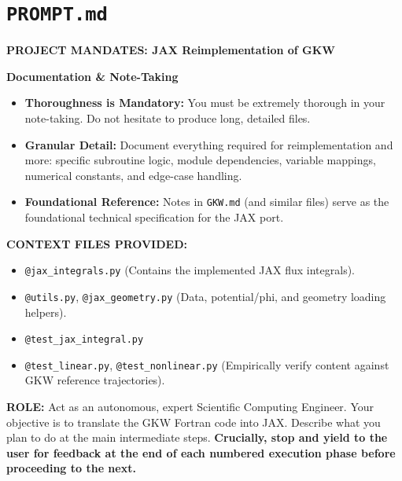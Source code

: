 \documentclass{article}
\theoremstyle{plain}
\theoremstyle{definition}
\theoremstyle{remark}
\begin{document}
\section{\texttt{PROMPT.md}}
\label{app:prompt}
\begin{promptbox}[]
\scriptsize\sffamily
\textbf{\normalsize PROJECT MANDATES: JAX Reimplementation of GKW}

\vspace{0.5em}
\textbf{Documentation \& Note-Taking}
\begin{itemize}[leftmargin=*, noitemsep, topsep=0pt]
    \item \textbf{Thoroughness is Mandatory:} You must be extremely thorough in your note-taking. Do not hesitate to produce long, detailed files.
    \item \textbf{Granular Detail:} Document everything required for reimplementation and more: specific subroutine logic, module dependencies, variable mappings, numerical constants, and edge-case handling.
    \item \textbf{Foundational Reference:} Notes in \texttt{GKW.md} (and similar files) serve as the foundational technical specification for the JAX port.
\end{itemize}

\vspace{0.5em}
\textbf{CONTEXT FILES PROVIDED:}
\begin{itemize}[leftmargin=*, noitemsep, topsep=0pt]
    \item \texttt{@jax\_integrals.py} (Contains the implemented JAX flux integrals).
    \item \texttt{@utils.py}, \texttt{@jax\_geometry.py} (Data, potential/phi, and geometry loading helpers).
    \item \texttt{@test\_jax\_integral.py}
    \item \texttt{@test\_linear.py}, \texttt{@test\_nonlinear.py} (Empirically verify content against GKW reference trajectories).
\end{itemize}

\vspace{0.5em}
\textbf{ROLE:} Act as an autonomous, expert Scientific Computing Engineer. Your objective is to translate the GKW Fortran code into JAX. Describe what you plan to do at the main intermediate steps. \textbf{Crucially, stop and yield to the user for feedback at the end of each numbered execution phase before proceeding to the next.}


\end{promptbox}
\end{document}
